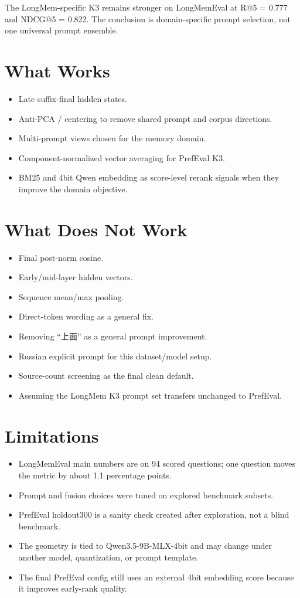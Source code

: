 \documentclass[11pt]{article}
\begin{document}
The LongMem-specific K3 remains stronger on LongMemEval at R@5 = 0.777 and
NDCG@5 = 0.822. The conclusion is domain-specific prompt selection, not one
universal prompt ensemble.

\section{What Works}

\begin{itemize}
  \item Late suffix-final hidden states.
  \item Anti-PCA / centering to remove shared prompt and corpus directions.
  \item Multi-prompt views chosen for the memory domain.
  \item Component-normalized vector averaging for PrefEval K3.
  \item BM25 and 4bit Qwen embedding as score-level rerank signals when they
    improve the domain objective.
\end{itemize}

\section{What Does Not Work}

\begin{itemize}
  \item Final post-norm cosine.
  \item Early/mid-layer hidden vectors.
  \item Sequence mean/max pooling.
  \item Direct-token wording as a general fix.
  \item Removing ``上面'' as a general prompt improvement.
  \item Russian explicit prompt for this dataset/model setup.
  \item Source-count screening as the final clean default.
  \item Assuming the LongMem K3 prompt set transfers unchanged to PrefEval.
\end{itemize}

\section{Limitations}

\begin{itemize}
  \item LongMemEval main numbers are on 94 scored questions; one question moves
  the metric by about 1.1 percentage points.
  \item Prompt and fusion choices were tuned on explored benchmark subsets.
  \item PrefEval holdout300 is a sanity check created after exploration, not a
  blind benchmark.
  \item The geometry is tied to Qwen3.5-9B-MLX-4bit and may change under another
  model, quantization, or prompt template.
  \item The final PrefEval config still uses an external 4bit embedding score
  because it improves early-rank quality.
\end{itemize}
\end{document}
